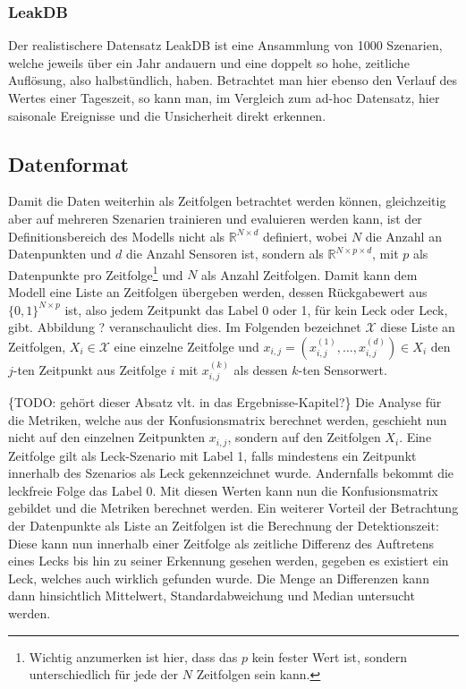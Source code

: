 \subsubsection*{LeakDB}

Der realistischere Datensatz LeakDB ist eine Ansammlung von 1000 Szenarien, welche jeweils über ein Jahr andauern
 und eine doppelt so hohe, zeitliche Auflösung, also halbstündlich, haben. Betrachtet man hier ebenso den Verlauf
 des Wertes einer Tageszeit, so kann man, im Vergleich zum ad-hoc Datensatz, hier saisonale Ereignisse und die
 Unsicherheit direkt erkennen.

\subsection*{Datenformat}

Damit die Daten weiterhin als Zeitfolgen betrachtet werden können, gleichzeitig aber auf mehreren Szenarien
 trainieren und evaluieren werden kann, ist der Definitionsbereich des Modells nicht als $\mathbb{R}^{N \times d}$
 definiert, wobei $N$ die Anzahl an Datenpunkten und $d$ die Anzahl Sensoren ist, sondern als
 $\mathbb{R}^{N \times p \times d}$, mit $p$ als Datenpunkte pro Zeitfolge\footnote{Wichtig anzumerken ist hier,
 dass das $p$ kein fester Wert ist, sondern unterschiedlich für jede der $N$ Zeitfolgen sein kann.} und $N$
 als Anzahl Zeitfolgen. Damit kann dem Modell eine Liste an Zeitfolgen übergeben werden,
 dessen Rückgabewert aus $\{0, 1\}^{N \times p}$ ist, also jedem Zeitpunkt das Label 0 oder 1, für kein Leck
 oder Leck, gibt. Abbildung ? veranschaulicht dies. Im Folgenden bezeichnet $\mathcal{X}$ diese Liste an Zeitfolgen,
 $X_i \in \mathcal{X}$ eine einzelne Zeitfolge und $x_{i, j} = (x_{i, j}^{(1)}, \dots, x_{i, j}^{(d)}) \in X_i$ den $j$-ten
 Zeitpunkt aus Zeitfolge $i$ mit $x_{i, j}^{(k)}$ als dessen $k$-ten Sensorwert.

\{TODO: gehört dieser Absatz vlt. in das Ergebnisse-Kapitel?\} Die Analyse für die Metriken, welche aus der
 Konfusionsmatrix berechnet werden, geschieht nun nicht auf den einzelnen Zeitpunkten $x_{i, j}$, sondern auf
 den Zeitfolgen $X_i$. Eine Zeitfolge gilt als Leck-Szenario mit Label 1, falls mindestens ein Zeitpunkt
 innerhalb des Szenarios als Leck gekennzeichnet wurde. Andernfalls bekommt die leckfreie Folge das Label 0.
 Mit diesen Werten kann nun die Konfusionsmatrix gebildet und die Metriken berechnet werden. Ein weiterer Vorteil
 der Betrachtung der Datenpunkte als Liste an Zeitfolgen ist die Berechnung der Detektionszeit: Diese kann nun
 innerhalb einer Zeitfolge als zeitliche Differenz des Auftretens eines Lecks bis hin zu seiner Erkennung gesehen
 werden, gegeben es existiert ein Leck, welches auch wirklich gefunden wurde. Die Menge an Differenzen kann dann
 hinsichtlich Mittelwert, Standardabweichung und Median untersucht werden.

